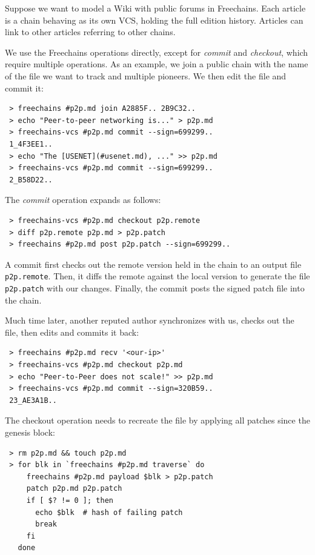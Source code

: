 \documentclass[10pt,journal,compsoc]{IEEEtran}
\newcommand{\FC}       {Freechains\xspace}
\begin{document}
Suppose we want to model a Wiki with public forums in \FC.
Each article is a chain behaving as its own VCS, holding the full edition
history.
Articles can link to other articles referring to other chains.

We use the \FC operations directly, except for \emph{commit} and
\emph{checkout}, which require multiple operations.
As an example, we join a public chain with the name of the file we want to
track and multiple pioneers.
We then edit the file and commit it:

{\footnotesize
\begin{verbatim}
 > freechains #p2p.md join A2885F.. 2B9C32..
 > echo "Peer-to-peer networking is..." > p2p.md
 > freechains-vcs #p2p.md commit --sign=699299..
 1_4F3EE1..
 > echo "The [USENET](#usenet.md), ..." >> p2p.md
 > freechains-vcs #p2p.md commit --sign=699299..
 2_B58D22..
\end{verbatim}
}

The \emph{commit} operation expands as follows:

{\footnotesize
\begin{verbatim}
 > freechains-vcs #p2p.md checkout p2p.remote
 > diff p2p.remote p2p.md > p2p.patch
 > freechains #p2p.md post p2p.patch --sign=699299..
\end{verbatim}
}

A commit first checks out the remote version held in the chain to an output
file \texttt{p2p.remote}.
Then, it diffs the remote against the local version to generate the file
\texttt{p2p.patch} with our changes.
Finally, the commit posts the signed patch file into the chain.

Much time later, another reputed author synchronizes with us, checks out the
file, then edits and commits it back:

{\footnotesize
\begin{verbatim}
 > freechains #p2p.md recv '<our-ip>'
 > freechains-vcs #p2p.md checkout p2p.md
 > echo "Peer-to-Peer does not scale!" >> p2p.md
 > freechains-vcs #p2p.md commit --sign=320B59..
 23_AE3A1B..
\end{verbatim}
}

The checkout operation needs to recreate the file by applying all patches since
the genesis block:

{\footnotesize
\begin{verbatim}
 > rm p2p.md && touch p2p.md
 > for blk in `freechains #p2p.md traverse` do
     freechains #p2p.md payload $blk > p2p.patch
     patch p2p.md p2p.patch
     if [ $? != 0 ]; then
       echo $blk  # hash of failing patch
       break
     fi
   done
\end{verbatim}
}
\end{document}
